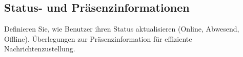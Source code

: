 \subsection{Status- und Präsenzinformationen}

Definieren Sie, wie Benutzer ihren Status aktualisieren (Online, Abwesend, Offline).
Überlegungen zur Präsenzinformation für effiziente Nachrichtenzustellung.